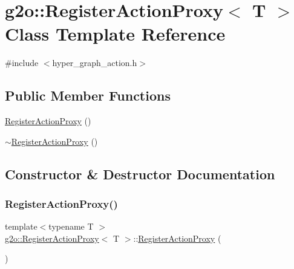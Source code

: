 \hypertarget{classg2o_1_1_register_action_proxy}{}\section{g2o\+:\+:Register\+Action\+Proxy$<$ T $>$ Class Template Reference}
\label{classg2o_1_1_register_action_proxy}


{\ttfamily \#include $<$hyper\+\_\+graph\+\_\+action.\+h$>$}

\subsection*{Public Member Functions}
\begin{DoxyCompactItemize}
\item 
\mbox{\hyperlink{classg2o_1_1_register_action_proxy_a2998e33a5b4627b38b58a493c16d65e6}{Register\+Action\+Proxy}} ()
\item 
\mbox{\hyperlink{classg2o_1_1_register_action_proxy_a73e8eacc965c3e9bb2084570c6b67eed}{$\sim$\+Register\+Action\+Proxy}} ()
\end{DoxyCompactItemize}


\subsection{Constructor \& Destructor Documentation}
\mbox{\label{classg2o_1_1_register_action_proxy_a2998e33a5b4627b38b58a493c16d65e6}} 
\subsubsection{\texorpdfstring{Register\+Action\+Proxy()}{RegisterActionProxy()}}
{\footnotesize\ttfamily template$<$typename T $>$ \\
\mbox{\hyperlink{classg2o_1_1_register_action_proxy}{g2o\+::\+Register\+Action\+Proxy}}$<$ T $>$\+::\mbox{\hyperlink{classg2o_1_1_register_action_proxy}{Register\+Action\+Proxy}} (\begin{DoxyParamCaption}{ }\end{DoxyParamCaption})\hspace{0.3cm}{\ttfamily [inline]}}

